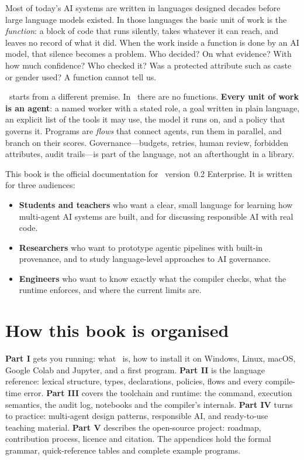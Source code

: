 Most of today's AI systems are written in languages designed decades before large language models existed. In those languages the basic unit of work is the \emph{function}: a block of code that runs silently, takes whatever it can reach, and leaves no record of what it did. When the work inside a function is done by an AI model, that silence becomes a problem. Who decided? On what evidence? With how much confidence? Who checked it? Was a protected attribute such as caste or gender used? A function cannot tell us.

\algolang\ starts from a different premise. In \algolang\ there are no functions. \textbf{Every unit of work is an agent}: a named worker with a stated role, a goal written in plain language, an explicit list of the tools it may use, the model it runs on, and a policy that governs it. Programs are \emph{flows} that connect agents, run them in parallel, and branch on their scores. Governance---budgets, retries, human review, forbidden attributes, audit trails---is part of the language, not an afterthought in a library.

This book is the official documentation for \algolang\ version~0.2 Enterprise. It is written for three audiences:

\begin{itemize}
  \item \textbf{Students and teachers} who want a clear, small language for learning how multi-agent AI systems are built, and for discussing responsible AI with real code.
  \item \textbf{Researchers} who want to prototype agentic pipelines with built-in provenance, and to study language-level approaches to AI governance.
  \item \textbf{Engineers} who want to know exactly what the compiler checks, what the runtime enforces, and where the current limits are.
\end{itemize}

\section*{How this book is organised}

\textbf{Part I} gets you running: what \algolang\ is, how to install it on Windows, Linux, macOS, Google Colab and Jupyter, and a first program. \textbf{Part II} is the language reference: lexical structure, types, declarations, policies, flows and every compile-time error. \textbf{Part III} covers the toolchain and runtime: the  command, execution semantics, the audit log, notebooks and the compiler's internals. \textbf{Part IV} turns to practice: multi-agent design patterns, responsible AI, and ready-to-use teaching material. \textbf{Part V} describes the open-source project: roadmap, contribution process, licence and citation. The appendices hold the formal grammar, quick-reference tables and complete example programs.

